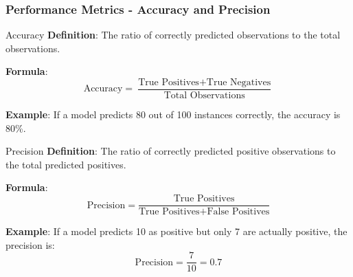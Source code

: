 \documentclass[aspectratio=169]{beamer}
\begin{document}
\begin{frame}[fragile]
    \frametitle{Performance Metrics - Accuracy and Precision}
    \begin{block}{Accuracy}
        \textbf{Definition}: The ratio of correctly predicted observations to the total observations.
        
        \textbf{Formula}:
        \begin{equation}
            \text{Accuracy} = \frac{\text{True Positives} + \text{True Negatives}}{\text{Total Observations}}
        \end{equation}
        
        \textbf{Example}: If a model predicts 80 out of 100 instances correctly, the accuracy is 80\%.
    \end{block}
    
    \begin{block}{Precision}
        \textbf{Definition}: The ratio of correctly predicted positive observations to the total predicted positives.
        
        \textbf{Formula}:
        \begin{equation}
            \text{Precision} = \frac{\text{True Positives}}{\text{True Positives} + \text{False Positives}}
        \end{equation}
        
        \textbf{Example}: If a model predicts 10 as positive but only 7 are actually positive, the precision is:
        \begin{equation}
            \text{Precision} = \frac{7}{10} = 0.7
        \end{equation}
    \end{block}
\end{frame}
\end{document}
